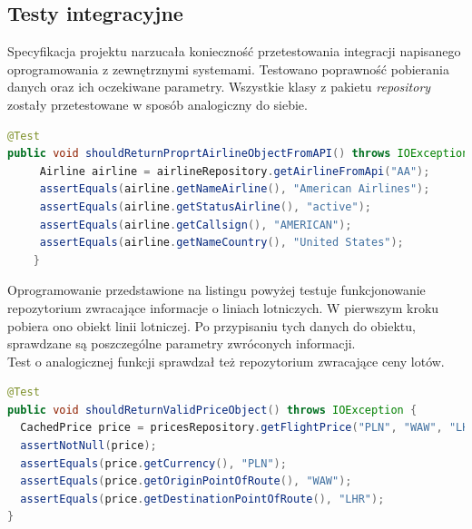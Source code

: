 \documentclass[12pt, twoside]{report}
\begin{document}
\subsection{Testy integracyjne}
Specyfikacja projektu narzucała konieczność przetestowania integracji napisanego oprogramowania z zewnętrznymi systemami. Testowano poprawność pobierania danych oraz ich oczekiwane parametry. Wszystkie klasy z pakietu \textit{repository} zostały przetestowane w sposób analogiczny do siebie.
\begin{lstlisting}[language=java, caption=Przykładowy test jednostkowy]
@Test
public void shouldReturnProprtAirlineObjectFromAPI() throws IOException {
     Airline airline = airlineRepository.getAirlineFromApi("AA");
     assertEquals(airline.getNameAirline(), "American Airlines");
     assertEquals(airline.getStatusAirline(), "active");
     assertEquals(airline.getCallsign(), "AMERICAN");
     assertEquals(airline.getNameCountry(), "United States");
    }
\end{lstlisting}
Oprogramowanie przedstawione na listingu powyżej testuje funkcjonowanie repozytorium zwracające informacje o liniach lotniczych. W pierwszym kroku pobiera ono obiekt linii lotniczej. Po przypisaniu tych danych do obiektu, sprawdzane są poszczególne parametry zwróconych informacji. \\ \indent
Test o analogicznej funkcji sprawdzał też repozytorium zwracające ceny lotów.
\begin{lstlisting}[language=java, caption=Przykładowy test jednostkowy]
@Test
public void shouldReturnValidPriceObject() throws IOException {
  CachedPrice price = pricesRepository.getFlightPrice("PLN", "WAW", "LHR", "20190128", "20190130");
  assertNotNull(price);
  assertEquals(price.getCurrency(), "PLN");
  assertEquals(price.getOriginPointOfRoute(), "WAW");
  assertEquals(price.getDestinationPointOfRoute(), "LHR");
}
\end{lstlisting}

\newpage
\end{document}
